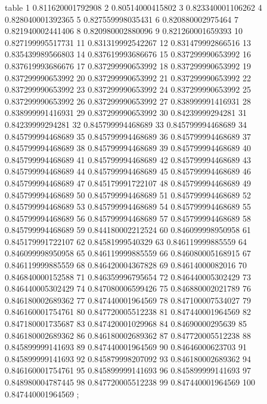 table {%
	1 0.811620001792908
	2 0.80514000415802
	3 0.823340001106262
	4 0.828040001392365
	5 0.827559998035431
	6 0.820880002975464
	7 0.821940002441406
	8 0.820980002880096
	9 0.821260001659393
	10 0.827199995517731
	11 0.831319992542267
	12 0.831479992866516
	13 0.835439989566803
	14 0.837619993686676
	15 0.837299990653992
	16 0.837619993686676
	17 0.837299990653992
	18 0.837299990653992
	19 0.837299990653992
	20 0.837299990653992
	21 0.837299990653992
	22 0.837299990653992
	23 0.837299990653992
	24 0.837299990653992
	25 0.837299990653992
	26 0.837299990653992
	27 0.838999991416931
	28 0.838999991416931
	29 0.837299990653992
	30 0.84239999294281
	31 0.84239999294281
	32 0.845799994468689
	33 0.845799994468689
	34 0.845799994468689
	35 0.845799994468689
	36 0.845799994468689
	37 0.845799994468689
	38 0.845799994468689
	39 0.845799994468689
	40 0.845799994468689
	41 0.845799994468689
	42 0.845799994468689
	43 0.845799994468689
	44 0.845799994468689
	45 0.845799994468689
	46 0.845799994468689
	47 0.845179991722107
	48 0.845799994468689
	49 0.845799994468689
	50 0.845799994468689
	51 0.845799994468689
	52 0.845799994468689
	53 0.845799994468689
	54 0.845799994468689
	55 0.845799994468689
	56 0.845799994468689
	57 0.845799994468689
	58 0.845799994468689
	59 0.844180002212524
	60 0.846099998950958
	61 0.845179991722107
	62 0.84581999540329
	63 0.846119999885559
	64 0.846099998950958
	65 0.846119999885559
	66 0.846080005168915
	67 0.846119999885559
	68 0.846420004367828
	69 0.84614000082016
	70 0.846840000152588
	71 0.846359996795654
	72 0.846440005302429
	73 0.846440005302429
	74 0.847080006599426
	75 0.846880002021789
	76 0.846180002689362
	77 0.847440001964569
	78 0.847100007534027
	79 0.846160001754761
	80 0.847720005512238
	81 0.847440001964569
	82 0.847180001735687
	83 0.847420001029968
	84 0.84690000295639
	85 0.846180002689362
	86 0.846180002689362
	87 0.847720005512238
	88 0.845899999141693
	89 0.847440001964569
	90 0.84646000623703
	91 0.845899999141693
	92 0.845879998207092
	93 0.846180002689362
	94 0.846160001754761
	95 0.845899999141693
	96 0.845899999141693
	97 0.848980004787445
	98 0.847720005512238
	99 0.847440001964569
	100 0.847440001964569
};
